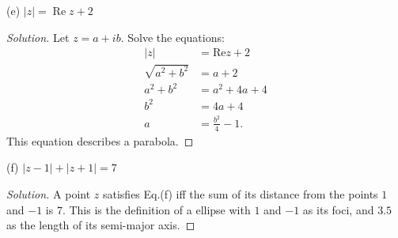 \begin{enumerate}
(e) $|z|=\operatorname{Re} z+2$
\begin{proof}[Solution]
Let $z = a + i b$. Solve the equations:
\begin{align*}
	|z| &= \text{Re}z + 2\\
	\sqrt{a^2 + b^2} &= a + 2\\
	a^2 + b^2 &= a^2 + 4a + 4\\
	b^2 &= 4a+4\\
	a &= \frac{b^2}{4}-1
.\end{align*}
This equation describes a parabola.
\end{proof}
(f) $|z-1|+|z+1|=7$
\begin{proof}[Solution]
	A point $z $ satisfies Eq.(f) iff the sum of its distance from the points $1$ and $-1$ is $7$. This is the definition of a ellipse with $1$ and  $-1$ as its foci, and  $3.5$ as the length of its semi-major axis.


\end{proof}
\end{enumerate}
